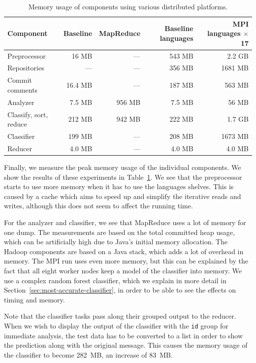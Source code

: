 \documentclass{article}
\begin{document}
\begin{table}[h!]
  \centering
  \begin{tabular}{l r r r r}
    \toprule
    \textbf{Component} & \textbf{Baseline} & \textbf{MapReduce} &
    \textbf{Baseline languages} & \textbf{MPI languages $\times$ 17} \\
    \midrule
    Preprocessor           & 16 MB   & ---    & 543 MB & 2.2 GB  \\
    \quad Repositories     & ---     & ---    & 356 MB & 1681 MB \\
    \quad Commit comments  & 16.4 MB & ---    & 187 MB & 563 MB  \\
    Analyzer               & 7.5 MB  & 956 MB & 7.5 MB & 56 MB   \\
    Classify, sort, reduce & 212 MB  & 942 MB & 222 MB & 1.7 GB  \\
    \quad Classifier       & 199 MB  & ---    & 208 MB & 1673 MB \\
    \quad Reducer          & 4.0 MB  & ---    & 4.0 MB & 4.0 MB  \\
    \bottomrule
  \end{tabular}
  \caption{Memory usage of components using various distributed platforms.}
  \label{tab:component-mem}
\end{table}
Finally, we measure the peak memory usage of the individual components. We show 
the results of these experiments in Table~\ref{tab:component-mem}. We see that 
the preprocessor starts to use more memory when it has to use the languages 
shelves. This is caused by a cache which aims to speed up and simplify the 
iterative reads and writes, although this does not seem to affect the running 
time.

For the analyzer and classifier, we see that MapReduce uses a lot of memory for 
one dump. The measurements are based on the total committed heap usage, which 
can be artificially high due to Java's initial memory allocation. The Hadoop 
components are based on a Java stack, which adds a lot of overhead in memory. 
The MPI run uses even more memory, but this can be explained by the fact that 
all eight worker nodes keep a model of the classifier into memory. We use 
a complex random forest classifier, which we explain in more detail in 
Section~\ref{sec:most-accurate-classifier}, in order to be able to see the 
effects on timing and memory.

Note that the classifier tasks pass along their grouped output to the reducer. 
When we wish to display the output of the classifier with the {\tt id} group 
for immediate analysis, the test data has to be converted to a list in order to 
show the prediction along with the original message. This causes the memory 
usage of the classifier to become 282~MB, an increase of 83~MB.
\end{document}
